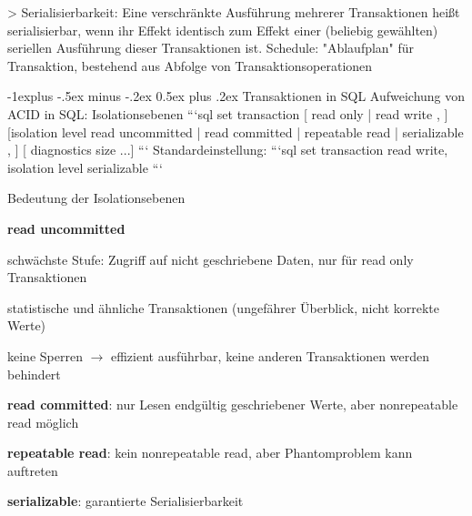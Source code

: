 \documentclass[a4paper]{article}
\makeatletter
\renewcommand{\subsection}{\@startsection{subsection}{2}{0mm}%
                                {-1explus -.5ex minus -.2ex}%
                                {0.5ex plus .2ex}%
                                {\normalfont\normalsize\bfseries}}
\makeatother
\begin{document}
\begin{multicols}{3}
\begin{itemize*}
        > Serialisierbarkeit: Eine verschränkte Ausführung mehrerer Transaktionen heißt serialisierbar, wenn ihr Effekt identisch zum Effekt einer (beliebig gewählten) seriellen Ausführung dieser Transaktionen ist.
        Schedule: "Ablaufplan" für Transaktion, bestehend aus Abfolge von Transaktionsoperationen

        \subsection{Transaktionen in SQL}
        Aufweichung von ACID in SQL: Isolationsebenen
        ```sql
        set transaction
            [ { read only | read write }, ]
            [isolation level
                    { read uncommitted |
                        read committed |
                        repeatable read |
                        serializable }, ]
            [ diagnostics size ...]
        ```
        Standardeinstellung:
        ```sql
        set transaction read write,
        isolation level serializable
        ```

        Bedeutung der Isolationsebenen
        \begin{itemize*}
            \item \textbf{read uncommitted}
            \begin{itemize*}
                \item schwächste Stufe: Zugriff auf nicht geschriebene Daten, nur für read only Transaktionen
                \item statistische und ähnliche Transaktionen (ungefährer Überblick, nicht korrekte Werte)
                \item keine Sperren $\rightarrow$ effizient ausführbar, keine anderen Transaktionen werden behindert
            \end{itemize*}
            \item \textbf{read committed}: nur Lesen endgültig geschriebener Werte, aber nonrepeatable read möglich
            \item \textbf{repeatable read}: kein nonrepeatable read, aber Phantomproblem kann auftreten
            \item \textbf{serializable}: garantierte Serialisierbarkeit
        \end{itemize*}



\end{itemize*}
\end{multicols}
\end{document}
